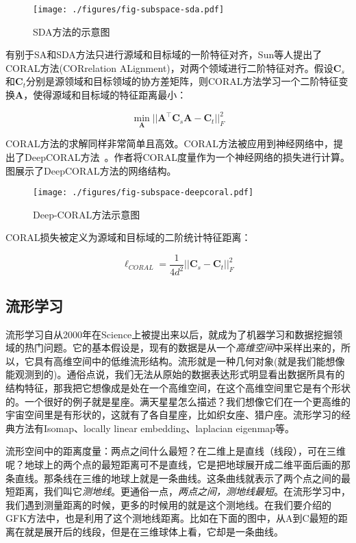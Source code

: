 \begin{figure}[htbp]
	\centering
	\texttt{[image: ./figures/fig-subspace-sda.pdf]}
	\caption{SDA方法的示意图}
	\label{fig-subspace-sda}
\end{figure}

有别于SA和SDA方法只进行源域和目标域的一阶特征对齐，Sun等人提出了CORAL方法(CORrelation ALignment)，对两个领域进行二阶特征对齐。假设$\mathbf{C}_s$和$\mathbf{C}_t$分别是源领域和目标领域的协方差矩阵，则CORAL方法学习一个二阶特征变换$\mathbf{A}$，使得源域和目标域的特征距离最小：

\begin{equation}
	\min_\mathbf{A} ||\mathbf{A}^\top \mathbf{C}_s \mathbf{A} - \mathbf{C}_t||^2_F
\end{equation}

CORAL方法的求解同样非常简单且高效。CORAL方法被应用到神经网络中，提出了DeepCORAL方法~\cite{sun2016deep}。作者将CORAL度量作为一个神经网络的损失进行计算。图展示了DeepCORAL方法的网络结构。

\begin{figure}[htbp]
	\centering
	\texttt{[image: ./figures/fig-subspace-deepcoral.pdf]}
	\caption{Deep-CORAL方法示意图}
	\label{fig-subspace-deepcoral}
\end{figure}

CORAL损失被定义为源域和目标域的二阶统计特征距离：

\begin{equation}
	\ell_{CORAL} = \frac{1}{4d^2} ||\mathbf{C}_s - \mathbf{C}_t||^2_F
\end{equation}

\subsection{流形学习}

流形学习自从2000年在Science上被提出来以后，就成为了机器学习和数据挖掘领域的热门问题。它的基本假设是，现有的数据是从一个\textit{高维空间}中采样出来的，所以，它具有高维空间中的低维流形结构。流形就是一种几何对象(就是我们能想像能观测到的)。通俗点说，我们无法从原始的数据表达形式明显看出数据所具有的结构特征，那我把它想像成是处在一个高维空间，在这个高维空间里它是有个形状的。一个很好的例子就是星座。满天星星怎么描述？我们想像它们在一个更高维的宇宙空间里是有形状的，这就有了各自星座，比如织女座、猎户座。流形学习的经典方法有Isomap、locally linear embedding、laplacian eigenmap等。

流形空间中的距离度量：两点之间什么最短？在二维上是直线（线段），可在三维呢？地球上的两个点的最短距离可不是直线，它是把地球展开成二维平面后画的那条直线。那条线在三维的地球上就是一条曲线。这条曲线就表示了两个点之间的最短距离，我们叫它\textit{测地线}。更通俗一点，\textit{两点之间，测地线最短}。在流形学习中，我们遇到测量距离的时候，更多的时候用的就是这个测地线。在我们要介绍的GFK方法中，也是利用了这个测地线距离。比如在下面的图中，从A到C最短的距离在就是展开后的线段，但是在三维球体上看，它却是一条曲线。

